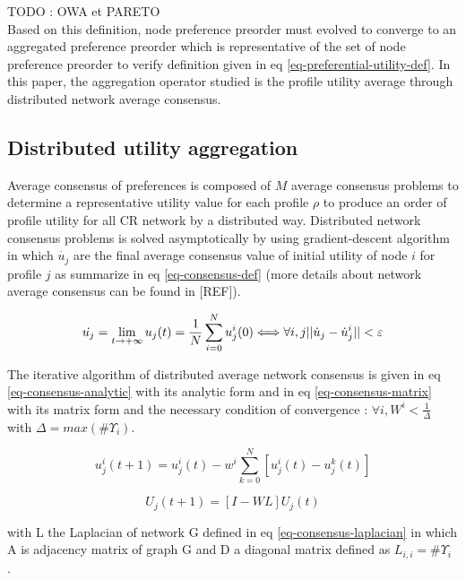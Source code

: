 \documentclass[conference]{IEEEtran}
\begin{document}
TODO : OWA et PARETO\\

Based on this definition, node preference preorder must evolved to converge to an aggregated preference preorder which is representative of the set of node preference preorder to verify definition given in eq \ref{eq-preferential-utility-def}. In this paper, the aggregation operator studied is the profile utility average through distributed network average consensus.

\subsection{Distributed utility aggregation}
Average consensus of preferences is composed of $M$ average consensus problems to determine a representative utility value for each profile $\rho$ to produce an order of profile utility for all CR network by a distributed way. Distributed network consensus problems is solved asymptotically by using gradient-descent algorithm in which $\dot{u_j}$ are the final average consensus value of initial utility of node $i$ for profile $j$ as summarize in eq \ref{eq-consensus-def} (more details about network average consensus can be found in [REF]). 

\begin{equation}
\label{eq-consensus-def}
\displaystyle
\dot{u_j} =  \lim_{t \to +\infty } u_j(t)  =  {1 \over N } \sum_{i=0}^N u_j^i(0)  \Longleftrightarrow \forall i,j || \dot{u}_j - \dot{u}_j^i || < \varepsilon
\end{equation}

The iterative algorithm of distributed average network consensus is given in eq \ref{eq-consensus-analytic} with its analytic form and in eq \ref{eq-consensus-matrix} with its matrix form and the necessary condition of convergence : $\forall i, W^i < \frac{1}{\Delta}$ with $\Delta = max(\#\Upsilon_i)$.

\begin{equation}
\label{eq-consensus-analytic}
\displaystyle
u_j^i(t+1) = u_j^i(t) - w^i \sum_{k=0}^N[u_j^i(t) - u_j^k(t)]
\end{equation}

\begin{equation}
\label{eq-consensus-matrix}
\displaystyle
U_j(t+1) = [I-WL]U_j(t)
\end{equation}

with L the Laplacian of network G defined in eq \ref{eq-consensus-laplacian} in which A is adjacency matrix of graph G and D a diagonal matrix defined as $L_{i,i} = \#\Upsilon_i$ .
\end{document}
